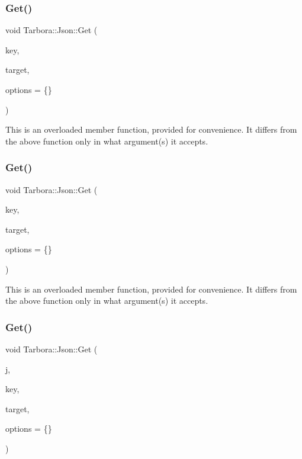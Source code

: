 \subsubsection{\texorpdfstring{Get()}{Get()}\hspace{0.1cm}{\footnotesize\ttfamily [5/18]}}
{\footnotesize\ttfamily void Tarbora\+::\+Json\+::\+Get (\begin{DoxyParamCaption}\item[{const char $\ast$}]{key,  }\item[{unsigned int $\ast$}]{target,  }\item[{\hyperlink{structTarbora_1_1JsonOptions}{Json\+Options}}]{options = {\ttfamily \{\}} }\end{DoxyParamCaption})}

This is an overloaded member function, provided for convenience. It differs from the above function only in what argument(s) it accepts. \mbox{\label{classTarbora_1_1Json_a5c9177d86857f6f80b5a5eac9adde4d2}} 
\subsubsection{\texorpdfstring{Get()}{Get()}\hspace{0.1cm}{\footnotesize\ttfamily [6/18]}}
{\footnotesize\ttfamily void Tarbora\+::\+Json\+::\+Get (\begin{DoxyParamCaption}\item[{const char $\ast$}]{key,  }\item[{std\+::string $\ast$}]{target,  }\item[{\hyperlink{structTarbora_1_1JsonOptions}{Json\+Options}}]{options = {\ttfamily \{\}} }\end{DoxyParamCaption})}

This is an overloaded member function, provided for convenience. It differs from the above function only in what argument(s) it accepts. \mbox{\label{classTarbora_1_1Json_acf1db08b245d7f9b40576b412194b287}} 
\subsubsection{\texorpdfstring{Get()}{Get()}\hspace{0.1cm}{\footnotesize\ttfamily [7/18]}}
{\footnotesize\ttfamily void Tarbora\+::\+Json\+::\+Get (\begin{DoxyParamCaption}\item[{raw\+\_\+json}]{j,  }\item[{const char $\ast$}]{key,  }\item[{raw\+\_\+json $\ast$}]{target,  }\item[{\hyperlink{structTarbora_1_1JsonOptions}{Json\+Options}}]{options = {\ttfamily \{\}} }\end{DoxyParamCaption})}



